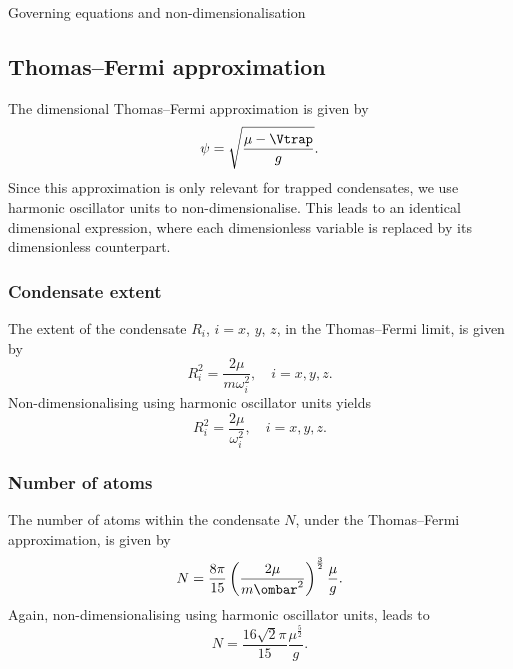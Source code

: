 \begin{chapter}{\label{cha:equations}Governing equations and
  non-dimensionalisation}
  \subsection{Thomas--Fermi approximation}
  The dimensional Thomas--Fermi approximation is given by
  \begin{equation*}
    \psi = \sqrt{\frac{\mu-\Vtrap}{g}}.
  \end{equation*}
  Since this approximation is only relevant for trapped condensates, we use
  harmonic oscillator units to non-dimensionalise.  This leads to an identical
  dimensional expression, where each dimensionless variable is replaced by its
  dimensionless counterpart.

  \subsubsection{Condensate extent}
  The extent of the condensate $R_{i}$, $i = x$, $y$, $z$, in the Thomas--Fermi
  limit, is given by
  \begin{equation*}
    R_{i}^{2} = \frac{2\mu}{m\omega_{i}^{2}}, \quad i = x, y, z.
  \end{equation*}
  Non-dimensionalising using harmonic oscillator units yields
  \begin{equation*}
    R_{i}^{2} = \frac{2\mu}{\omega_{i}^{2}}, \quad i = x, y, z.
  \end{equation*}

  \subsubsection{Number of atoms}
  The number of atoms within the condensate $N$, under the Thomas--Fermi
  approximation, is given by
  \begin{equation*}
    N = \frac{8\pi}{15} \left( \frac{2\mu}{m\ombar^2} \right)^{\frac{3}{2}}
    \frac{\mu}{g}.
  \end{equation*}
  Again, non-dimensionalising using harmonic oscillator units, leads to
  \begin{equation*}
    N = \frac{16\sqrt{2}\pi}{15} \frac{\mu^{\frac{5}{2}}}{g}.
  \end{equation*}


\end{chapter}
